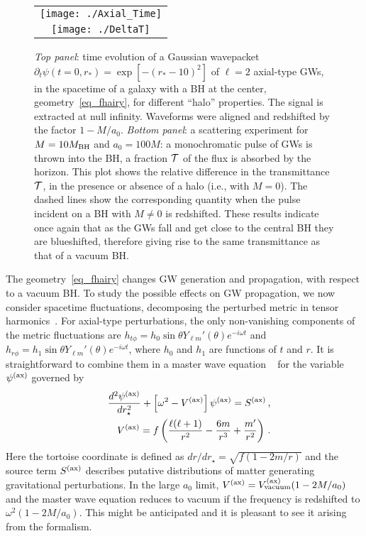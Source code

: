 \documentclass[twocolumn,preprintnumbers,nofootinbib,prd,superscriptaddress,aps]{revtex4-1}
\newcommand{\del}{\partial}
\newcommand{\beq}{\begin{eqnarray}}
\newcommand{\eeq}{\end{eqnarray}}
\begin{document}
%
\begin{figure}[ht!]
\begin{tabular}{c}
\texttt{[image: ./Axial\_Time]}\\
\texttt{[image: ./DeltaT]}
\end{tabular}{}
\caption{\textit{Top panel}: time evolution of a Gaussian wavepacket $\del_t \psi (t=0, r_*) = \exp\left[ - (r_* - 10)^2  \right]$ of $\ell=2$ axial-type GWs, in the spacetime of a galaxy with a BH at the center, geometry~\eqref{eq_fhairy}, for different ``halo'' properties. The signal is extracted at null infinity. Waveforms were aligned and redshifted by the factor $1-M/a_0$. 
\textit{Bottom panel}: a scattering experiment for $M=10 M_{\rm BH}$ and $a_0=100M$: a monochromatic pulse of GWs is thrown into the BH, a fraction ${\cal T}$ of the flux is absorbed by the horizon. This plot shows the relative difference in the transmittance ${\cal T}$, in the presence or absence of a halo (i.e., with $M=0$). The dashed lines show the corresponding quantity when the pulse incident on a BH with $M\neq 0$ is redshifted. These results indicate once again that as the GWs fall and get close to the central BH they are blueshifted, therefore giving rise to the same transmittance as that of a vacuum BH. \label{axial_scatters}}
\end{figure}
%
%
The geometry~\eqref{eq_fhairy} changes GW generation and propagation, with respect to a vacuum BH. To study the possible effects on GW propagation, we now consider spacetime fluctuations, decomposing the perturbed metric in tensor harmonics~\cite{Regge:1957td,Zerilli:1970wzz,Maggiore:2007ulw}.
For axial-type perturbations, the only non-vanishing components of the metric fluctuations are
$h_{t\phi}=h_0\sin\theta Y_{\ell m}'(\theta)e^{-i\omega t}$ and $h_{r\phi}=h_1\sin\theta Y_{\ell m}'(\theta)e^{-i\omega t}$, where $h_0$ and $h_1$ are functions of $t$ and $r$. It is straightforward to combine them in a master wave equation
~\cite{1967ApJ...149..591T,1983ApJS...53...73L} for the variable $\psi^\textnormal{(ax)}$ governed by
%
\beq
&&\frac{d^2\psi^\textnormal{(ax)}}{dr_\star^2}+\left[\omega^2-V^\textnormal{(ax)}\right]\psi^\textnormal{(ax)}=S^\textnormal{(ax)}\,,\\
%
&&V^\textnormal{(ax)}=f\left(\frac{\ell(\ell+1)}{r^2}-\frac{6m}{r^3}+\frac{m'}{r^2}\right)\,.\label{eq:Vax}
\eeq
%
Here the tortoise coordinate is defined as $dr/dr_\star=\sqrt{f(1-2m/r)}$ and the source term $S^\textnormal{(ax)}$ describes putative distributions of matter generating gravitational perturbations.
In the large $a_0$ limit, $V^\textnormal{(ax)}=V^\textnormal{(ax)}_{\rm vacuum}(1-2M/a_0)$ and the master wave equation reduces to vacuum
if the frequency is redshifted to $\omega^2 (1-2M/a_0)$. This might be anticipated and it is pleasant to see it arising from the formalism.
\end{document}
